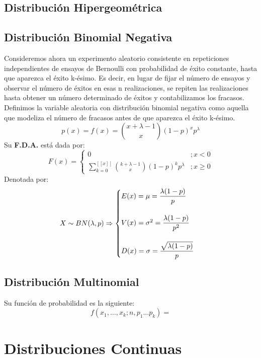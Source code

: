 \subsection{Distribución Hipergeométrica}
\subsection{Distribución Binomial Negativa}
Consideremos ahora un experimento aleatorio consistente en repeticiones independientes de
ensayos de Bernoulli con probabilidad de éxito constante, hasta que aparezca el éxito k-ésimo.
Es decir, en lugar de fijar el número de ensayos y observar el número de éxitos en esas n
realizaciones, se repiten las realizaciones hasta obtener un número determinado de éxitos y contabilizamos los fracasos. Definimos la variable aleatoria con
distribución binomial negativa
como aquella que modeliza el número de fracasos antes de que aparezca el éxito k-ésimo.
$$
p(x)=f(x)=\binom{x+\lambda-1}{x} (1-p)^x p^\lambda
$$
Su \textbf{F.D.A.} está dada por:
$$
F(x)=
\begin{cases}
0 &; x<0 \\
\displaystyle\sum_{k=0}^{[\![ x ]\!]} \binom{k+\lambda-1}{x} (1-p)^k p^\lambda &; x\geq 0
\end{cases}
$$
Denotada por:
$$
X\sim BN(\lambda,p)\Rightarrow
\begin{cases}
E(x)=\mu= \dfrac{\lambda(1-p)}{p} \\ \vspace{0.01cm} \\
V(x)=\sigma^2 = \dfrac{\lambda (1-p)}{p^2}\\ \vspace{0.01cm} \\
D(x)=\sigma= \dfrac{\sqrt{\lambda (1-p)}}{p}
\end{cases}
$$
\subsection{Distribución Multinomial}
Su función de probabilidad es la siguiente:
$$
f(x_1,\ldots ,x_k;n,p_1\ldots p_k)=
$$
\section{Distribuciones Continuas}
